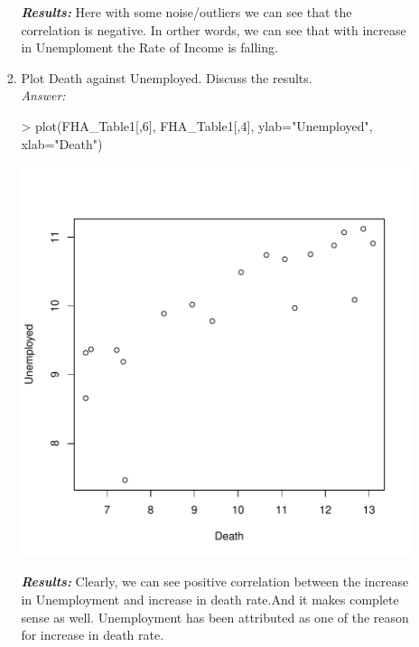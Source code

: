 \documentclass{article}
\begin{document}
\begin{enumerate}
\begin{enumerate}
\begin{enumerate}
\begin{center}
					\end{center}
					\textbf{\emph{Results:}} Here with some noise/outliers we can see that the correlation is negative. In orther words, we can see
					that with increase in Unemploment the Rate of Income is falling.
				\item Plot Death against Unemployed. Discuss the results.\\
				\emph{Answer:} 
					\begin{center}
\begin{Schunk}
\begin{Sinput}
> plot(FHA_Table1[,6], FHA_Table1[,4], ylab="Unemployed", xlab="Death")			
\end{Sinput}
\end{Schunk}
\includegraphics{debseal_HW2-006}
					\end{center}
				\textbf{\emph{Results:}} Clearly, we can see  positive correlation between the increase in Unemployment and increase in death rate.And it makes complete sense as well. Unemployment has been attributed as one of the reason for increase in death rate.
			\end{enumerate}				
			

\end{enumerate}
\end{enumerate}
\end{document}
